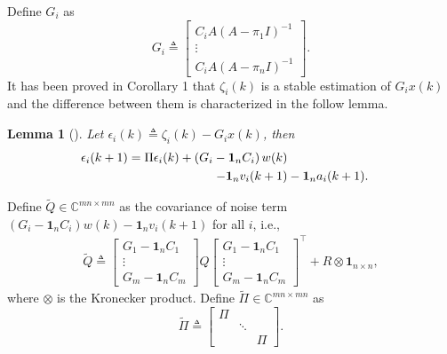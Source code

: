 \documentclass{ieeetrans}   %
\newcommand{\Cb}{{\mathbb{C}}}
\newtheorem{lemma}{\textbf{Lemma}}
\begin{document}
%
Define $G_i$ as
\begin{equation}\label{eq:def_Gi}
	G_{i} \triangleq\left[\begin{array}{c}
		C_{i} A\left(A-\pi_{1} I\right)^{-1} \\
		\vdots \\
		C_{i} A\left(A-\pi_{n} I\right)^{-1}
	\end{array}\right].
\end{equation}
It has been proved in \cite{liuxinghua-TAC2020} Corollary 1 that $\zeta_{i}(k)$ is a stable estimation of $G_ix(k)$ and the difference between them is characterized in the follow lemma.
\begin{lemma}[\hspace{-0.0001pt}\cite{liuxinghua-TAC2020}]\label{lm:epsilon}
	Let $\epsilon_i(k)\triangleq\zeta_{i}(k)-G_ix(k)$, then 
	\begin{align}
		\epsilon_{i}(k+1)= \Pi \epsilon_{i}(k)+\left(G_{i}-\mathbf{1}_{n} C_{i}\right) w(k) \notag \\
		-\mathbf{1}_{n} v_{i}(k+1)&-\mathbf{1}_{n} a_{i}(k+1) . \label{eq:epsilon}
	\end{align}
\end{lemma}
%
Define $\tilde{Q} \in \Cb^{m n \times m n}$ as the covariance of noise term $\left(G_{i}-\mathbf{1}_{n} C_{i}\right) w(k) -\mathbf{1}_{n} v_{i}(k+1)$ for all $i$, i.e.,
\begin{align}
	\tilde{Q} \triangleq
	\begin{bmatrix}
		G_1-\mathbf{1}_{n} C_1 \\
		\vdots \\
		G_m-\mathbf{1}_{n} C_m
	\end{bmatrix}
	Q\begin{bmatrix}
		G_1-\mathbf{1}_{n} C_1 \\
		\vdots \\
		G_m-\mathbf{1}_{n} C_m
	\end{bmatrix}^\top
	+ R\otimes \mathbf{1}_{n\times n},
\end{align}
where $\otimes$ is the Kronecker product.
Define $\tilde{\Pi}\in \Cb^{m n \times m n}$ as
$$
\tilde{\Pi} \triangleq\left[\begin{array}{ccc}
	\Pi & & \\
	& \ddots & \\
	& & \Pi
\end{array}\right].
$$
\end{document}
